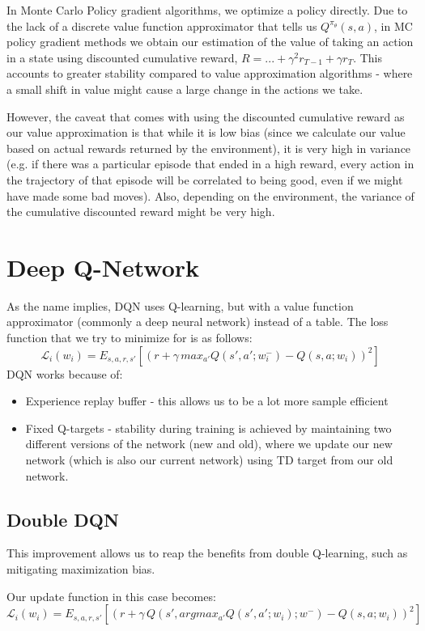 \documentclass[12pt]{article} %
\begin{document}
In Monte Carlo Policy gradient algorithms, we optimize a policy directly. Due to the lack of a discrete value function approximator that tells us $Q^{\pi_\theta}(s,a)$, in MC policy gradient methods we obtain our estimation of the value of taking an action in a state using discounted cumulative reward, $R = ...+\gamma^2 r_{T-1} + \gamma r_T$. This accounts to greater stability compared to value approximation algorithms - where a small shift in value might cause a large change in the actions we take.

However, the caveat that comes with using the discounted cumulative reward as our value approximation is that while it is low bias (since we calculate our value based on actual rewards returned by the environment), it is very high in variance (e.g. if there was a particular episode that ended in a high reward, every action in the trajectory of that episode will be correlated to being good, even if we might have made some bad moves). Also, depending on the environment, the variance of the cumulative discounted reward might be very high.  

\section{Deep Q-Network}
As the name implies, DQN uses Q-learning, but with a value function approximator (commonly a deep neural network) instead of a table. The loss function that we try to minimize for is as follows:
\begin{equation*}
    \mathcal{L}_i(w_i) = E_{s, a, r, s'}[(r + \gamma\,max_{a'}Q(s', a'; w_i^-) - Q(s, a; w_i))^2]
\end{equation*}
DQN works because of:
\begin{itemize}
    \item Experience replay buffer - this allows us to be a lot more sample efficient 
    \item Fixed Q-targets - stability during training is achieved by maintaining two different versions of the network (new and old), where we update our new network (which is also our current network) using TD target from our old network. 
\end{itemize}
\subsection{Double DQN}
This improvement allows us to reap the benefits from double Q-learning, such as mitigating maximization bias.

Our update function in this case becomes:
\begin{equation*}
    \mathcal{L}_i(w_i) = E_{s, a, r, s'}[(r + \gamma\,Q(s', argmax_{a'}Q(s', a'; w_i); w^-) - Q(s, a; w_i))^2]
\end{equation*}
\end{document}
